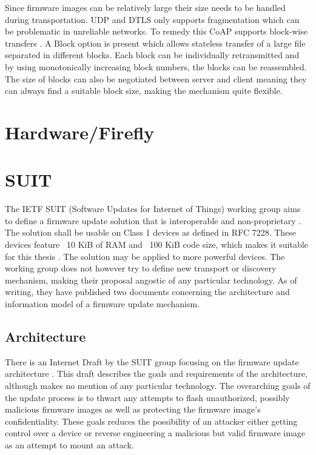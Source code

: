 \documentclass[0-thesis.tex]{subfiles}
\begin{document}
Since firmware images can be relatively large their size needs to be handled during transportation.
UDP and DTLS only supports fragmentation which can be problematic in unreliable networks. To 
remedy this CoAP supports block-wise transfers \parencite{rfc7959}. A Block option is 
present which allows stateless transfer of a large file separated in different blocks. 
Each block can be individually retransmitted and by using monotonically increasing block 
numbers, the blocks can be reassembled. The size of blocks can also be negotiated between 
server and client meaning they can always find a suitable block size, making the mechanism 
quite flexible.

\section{Hardware/Firefly}

\section{SUIT}
The IETF SUIT (Software Updates for Internet of Things) working group aims to define a firmware 
update solution that is interoperable and non-proprietary \parencite{suit}. The solution shall 
be usable on Class 1 devices as defined in RFC 7228. These devices feature ~10 KiB of RAM and 
~100 KiB code size, which makes it suitable for this thesis \parencite{rfc7228}. The solution 
may be applied to more powerful devices. The working group does not however try to define 
new transport or discovery mechanism, making their proposal angostic of any particular 
technology. As of writing, they have published two documents concerning the architecture and 
information model of a firmware update mechanism.

\subsection{Architecture}
There is an Internet Draft by the SUIT group focusing on the firmware update architecture 
\parencite{suit-architecture}. This draft describes the goals and requirements of the 
architecture, although makes no mention of any particular technology. The overarching goals 
of the update process is to thwart any attempts to flash unauthorized, possibly malicious 
firmware images as well as protecting the firmware image's confidentiality. These goals 
reduces the possibility of an attacker either getting control over a device or 
reverse engineering a malicious but valid firmware image as an attempt to mount an attack.
\end{document}
